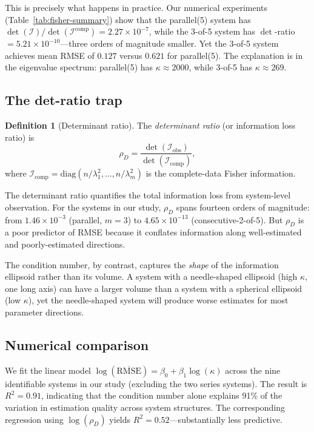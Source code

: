 \documentclass[12pt]{article}
\theoremstyle{definition}
\newtheorem{definition}[theorem]{Definition}
\theoremstyle{remark}
\newcommand{\diag}{\mathrm{diag}}
\begin{document}
This is precisely what happens in practice.  Our numerical experiments
(Table~\ref{tab:fisher-summary}) show that the parallel(5) system has
$\det(\mathcal{I}) / \det(\mathcal{I}^{\mathrm{comp}}) = 2.27 \times 10^{-7}$,
while the 3-of-5 system has
$\det$-ratio $= 5.21 \times 10^{-10}$---three orders of magnitude
smaller.  Yet the 3-of-5 system achieves mean RMSE of $0.127$
versus $0.621$ for parallel(5).  The explanation is in the eigenvalue
spectrum: parallel(5) has $\kappa \approx 2000$, while 3-of-5 has
$\kappa \approx 269$.

\subsection{The det-ratio trap}
\label{sec:det-ratio-trap}

\begin{definition}[Determinant ratio]
\label{def:det-ratio}
The \emph{determinant ratio} (or information loss ratio) is
\begin{equation}\label{eq:det-ratio}
  \rho_D = \frac{\det(\mathcal{I}_{\text{obs}})}
               {\det(\mathcal{I}_{\text{comp}})},
\end{equation}
where $\mathcal{I}_{\text{comp}} = \diag(n/\lambda_1^2, \ldots, n/\lambda_m^2)$
is the complete-data Fisher information.
\end{definition}

The determinant ratio quantifies the total information loss from
system-level observation.  For the systems in our study, $\rho_D$
spans fourteen orders of magnitude:
from $1.46 \times 10^{-3}$ (parallel, $m = 3$) to
$4.65 \times 10^{-13}$ (consecutive-2-of-5).  But $\rho_D$ is a
poor predictor of RMSE because it conflates information along
well-estimated and poorly-estimated directions.

The condition number, by contrast, captures the \emph{shape} of the
information ellipsoid rather than its volume.  A system with a
needle-shaped ellipsoid (high $\kappa$, one long axis) can have a
larger volume than a system with a spherical ellipsoid (low $\kappa$),
yet the needle-shaped system will produce worse estimates for most
parameter directions.

\subsection{Numerical comparison}
\label{sec:numerical-comparison}

We fit the linear model
$\log(\overline{\text{RMSE}}) = \beta_0 + \beta_1 \log(\kappa)$
across the nine identifiable systems in our study (excluding the two
series systems).  The result is $R^2 = 0.91$, indicating that the
condition number alone explains 91\% of the variation in estimation
quality across system structures.  The corresponding regression using
$\log(\rho_D)$ yields $R^2 = 0.52$---substantially less predictive.
\end{document}
